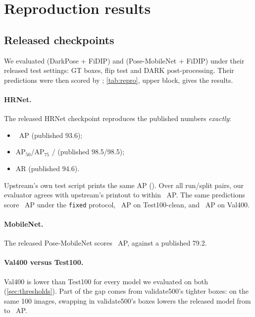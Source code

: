 \section{Reproduction results}\label{sec:repro}

\subsection{Released checkpoints}\label{sec:released}

We evaluated  (DarkPose + FiDIP) and  (Pose-MobileNet + FiDIP) under their released test settings: GT boxes, flip test and DARK post-processing.
Their predictions were then scored by ; \cref{tab:repro}, upper block, gives the results.

\paragraph{HRNet.} The released HRNet checkpoint reproduces the published numbers \emph{exactly}:
\begin{itemize}[leftmargin=*]
  \item {}~AP (published 93.6);
  \item AP$_{50}$/AP$_{75}$ / (published 98.5/98.5);
  \item AR  (published 94.6).
\end{itemize}
Upstream's own test script prints the same AP (). Over all  run/split pairs, our evaluator agrees with upstream's printout to within ~AP.
The same predictions score ~AP under the \texttt{fixed} protocol, ~AP on Test100-clean, and ~AP on Val400.

\paragraph{MobileNet.} The released Pose-MobileNet scores ~AP, against a published 79.2.

\paragraph{Val400 versus Test100.} Val400 is lower than Test100 for every model we evaluated on both (\cref{sec:thresholds}). Part of the gap comes from validate500's tighter boxes: on the same 100 images, swapping in validate500's boxes lowers the released model from  to ~AP.

